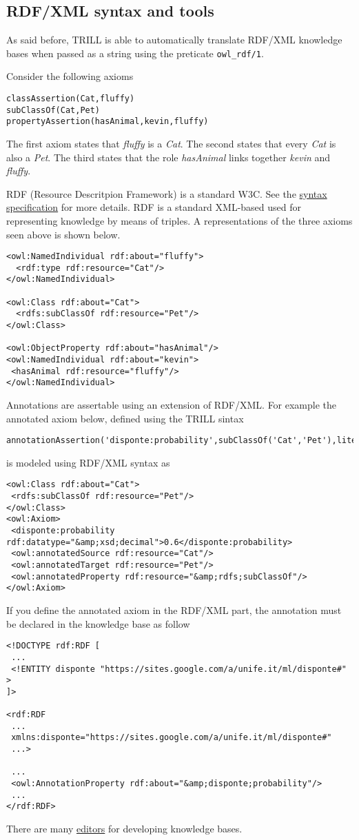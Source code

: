 \subsection{RDF/XML syntax and tools}
\label{rdfxml-syn}
As said before, TRILL is able to automatically translate RDF/XML knowledge bases when passed as a string using 
the preticate \verb|owl_rdf/1|.

Consider the following axioms 

\begin{verbatim}
classAssertion(Cat,fluffy)
subClassOf(Cat,Pet)
propertyAssertion(hasAnimal,kevin,fluffy)
\end{verbatim}

The first axiom states that \textit{fluffy} is a \textit{Cat}. The second states that every \textit{Cat} is also a \textit{Pet}. The third states that the role \textit{hasAnimal} links together \textit{kevin} and \textit{fluffy}.

RDF (Resource Descritpion Framework) is a standard W3C. See the \href{http://www.w3.org/TR/REC-rdf-syntax/}{syntax specification} for more details.
RDF is a standard XML-based used for representing knowledge by means of triples.
A representations of the three axioms seen above is shown below.
\begin{verbatim}
<owl:NamedIndividual rdf:about="fluffy">
  <rdf:type rdf:resource="Cat"/>
</owl:NamedIndividual>

<owl:Class rdf:about="Cat">
  <rdfs:subClassOf rdf:resource="Pet"/>
</owl:Class>

<owl:ObjectProperty rdf:about="hasAnimal"/>
<owl:NamedIndividual rdf:about="kevin">
 <hasAnimal rdf:resource="fluffy"/>
</owl:NamedIndividual>
\end{verbatim}

Annotations are assertable using an extension of RDF/XML. For example the annotated axiom below, defined using the TRILL sintax
\begin{verbatim}
annotationAssertion('disponte:probability',subClassOf('Cat','Pet'),literal('0.6')).
\end{verbatim}
is modeled using RDF/XML syntax as
\begin{verbatim}
<owl:Class rdf:about="Cat">
 <rdfs:subClassOf rdf:resource="Pet"/>
</owl:Class>
<owl:Axiom>
 <disponte:probability rdf:datatype="&amp;xsd;decimal">0.6</disponte:probability>
 <owl:annotatedSource rdf:resource="Cat"/>
 <owl:annotatedTarget rdf:resource="Pet"/>
 <owl:annotatedProperty rdf:resource="&amp;rdfs;subClassOf"/>
</owl:Axiom>
\end{verbatim}
If you define the annotated axiom in the RDF/XML part, the annotation must be declared in the knowledge base as follow
\begin{verbatim}
<!DOCTYPE rdf:RDF [
 ...
 <!ENTITY disponte "https://sites.google.com/a/unife.it/ml/disponte#" >
]>

<rdf:RDF
 ...
 xmlns:disponte="https://sites.google.com/a/unife.it/ml/disponte#"
 ...>

 ...
 <owl:AnnotationProperty rdf:about="&amp;disponte;probability"/>
 ...
</rdf:RDF>
\end{verbatim}

There are many \href{http://www.w3.org/2001/sw/wiki/Category:Editor}{editors} for developing knowledge bases.
